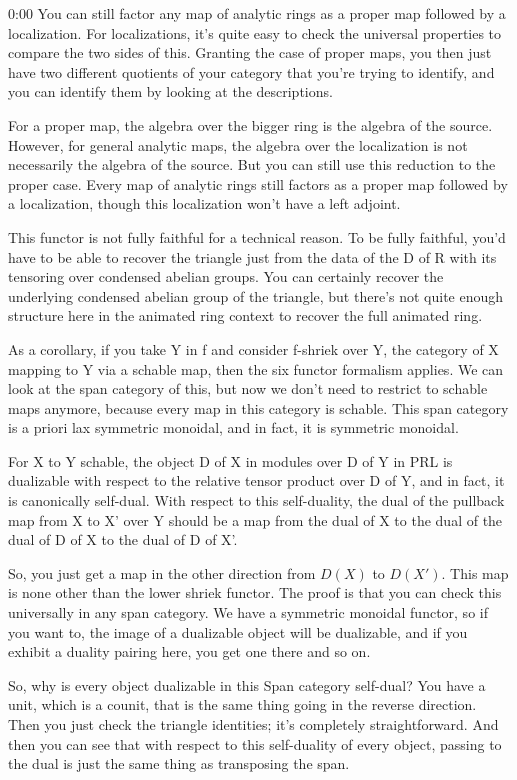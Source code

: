 \begin{unfinished}{0:00}
You can still factor any map of analytic rings as a proper map followed by a localization. For localizations, it's quite easy to check the universal properties to compare the two sides of this. Granting the case of proper maps, you then just have two different quotients of your category that you're trying to identify, and you can identify them by looking at the descriptions.

For a proper map, the algebra over the bigger ring is the algebra of the source. However, for general analytic maps, the algebra over the localization is not necessarily the algebra of the source. But you can still use this reduction to the proper case. Every map of analytic rings still factors as a proper map followed by a localization, though this localization won't have a left adjoint.

This functor is not fully faithful for a technical reason. To be fully faithful, you'd have to be able to recover the triangle just from the data of the D of R with its tensoring over condensed abelian groups. You can certainly recover the underlying condensed abelian group of the triangle, but there's not quite enough structure here in the animated ring context to recover the full animated ring.

As a corollary, if you take Y in f and consider f-shriek over Y, the category of X mapping to Y via a schable map, then the six functor formalism applies. We can look at the span category of this, but now we don't need to restrict to schable maps anymore, because every map in this category is schable. This span category is a priori lax symmetric monoidal, and in fact, it is symmetric monoidal.

For X to Y schable, the object D of X in modules over D of Y in PRL is dualizable with respect to the relative tensor product over D of Y, and in fact, it is canonically self-dual. With respect to this self-duality, the dual of the pullback map from X to X' over Y should be a map from the dual of X to the dual of the dual of D of X to the dual of D of X'.


So, you just get a map in the other direction from $D(X)$ to $D(X')$. This map is none other than the lower shriek functor. The proof is that you can check this universally in any span category. We have a symmetric monoidal functor, so if you want to, the image of a dualizable object will be dualizable, and if you exhibit a duality pairing here, you get one there and so on.

So, why is every object dualizable in this Span category self-dual? You have a unit, which is a counit, that is the same thing going in the reverse direction. Then you just check the triangle identities; it's completely straightforward. And then you can see that with respect to this self-duality of every object, passing to the dual is just the same thing as transposing the span.


\end{unfinished}
